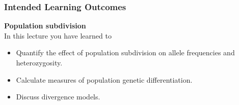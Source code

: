 \documentclass{beamer}
\newcommand{\1}{\ensuremath{\mathbf{1}}}
\begin{document}
%
%
%
\begin{frame}\frametitle{Intended Learning Outcomes}
	\textbf{Population subdivision}\\[2ex]
	In this lecture you have learned to
	\begin{itemize}
		\item Quantify the effect of population subdivision on allele frequencies and heterozygosity.
		\item Calculate measures of population genetic differentiation.
		\item Discuss divergence models.
	\end{itemize}
\end{frame}
%
%
%
\end{document}
